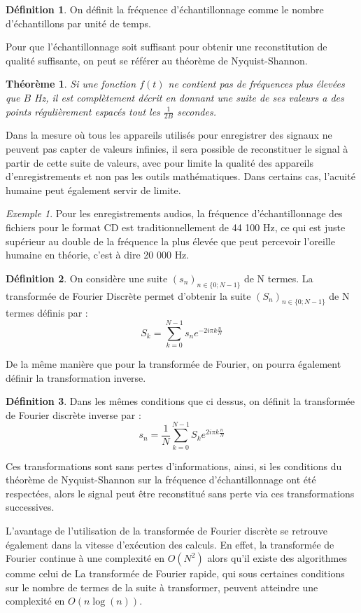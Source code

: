 \documentclass[]{article}
\newtheorem{mythm}{Théorème}
\theoremstyle{remark}
\newtheorem{myexmpl}{Exemple}
\theoremstyle{definition}
\newtheorem{mydef}{Définition}
\begin{document}
	\begin{mydef}
		On définit la fréquence d'échantillonnage comme le nombre d'échantillons par unité de temps.  
	\end{mydef}
		Pour que l'échantillonnage soit suffisant pour obtenir une reconstitution de qualité suffisante, on peut se référer au théorème de Nyquist-Shannon. 
		
	\begin{mythm}
		Si une fonction $f(t)$ ne contient pas de fréquences plus élevées que $B$ Hz, il est complètement décrit en donnant une suite de ses valeurs a des points régulièrement espacés tout les $\frac{1}{2B}$ secondes.
	\end{mythm}
	
	Dans la mesure où tous les appareils utilisés pour enregistrer des signaux ne peuvent pas capter de valeurs infinies, il sera possible de reconstituer le signal à partir de cette suite de valeurs, avec pour limite la qualité des appareils d'enregistrements et non pas les outils mathématiques. Dans certains cas, l'acuité humaine peut également servir de limite.
	
	\begin{myexmpl}
		 Pour les enregistrements audios, la fréquence d'échantillonnage des fichiers pour le format CD est traditionnellement de 44 100 Hz, ce qui est juste supérieur au double de la fréquence la plus élevée que peut percevoir l'oreille humaine en théorie, c'est à dire 20 000 Hz. 
	\end{myexmpl}
	
	\begin{mydef}
			On considère une suite $(s_n)_{n\in \{0; N -1 \}}$ de N termes. La transformée de Fourier Discrète permet d'obtenir la suite  $(S_n)_{n\in \{0; N -1 \}}$ de N termes définis par :
			$$ S_k = \sum_{k=0}^{N-1}s_n e^{-2i\pi k\frac{n}{N}} $$
	\end{mydef}
		De la même manière que pour la transformée de Fourier, on pourra également définir la transformation inverse.
		
	\begin{mydef}
		Dans les mêmes conditions que ci dessus, on définit la transformée de Fourier discrète inverse par :
			$$ s_n =\frac{1}{N} \sum_{k=0}^{N-1}S_k e^{2i\pi k\frac{n}{N}} $$
	\end{mydef}
	
	Ces transformations sont sans pertes d'informations, ainsi, si les conditions du théorème de Nyquist-Shannon sur la fréquence d'échantillonnage ont été respectées, alors le signal peut être reconstitué sans perte via ces transformations successives. 
	
	L'avantage de l'utilisation de la transformée de Fourier discrète se retrouve également dans la vitesse d'exécution des calculs. En effet, la transformée de Fourier continue à une complexité en $O(N^2)$ alors qu'il existe des algorithmes comme celui de La transformée de Fourier rapide, qui sous certaines conditions sur le nombre de termes de la suite à transformer, peuvent atteindre une complexité en $O(n\log(n))$.
	
	
\end{document}
